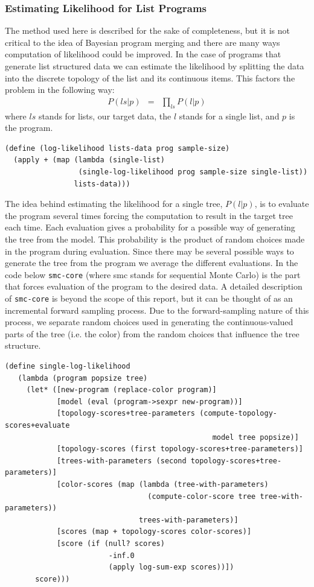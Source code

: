 \documentclass[a4paper,10pt]{article}
\begin{document}
\subsubsection{Estimating Likelihood for List Programs}
The method used here is described for the sake of completeness, but it is not critical to the idea of Bayesian program merging and there are many ways computation of likelihood could be improved.  In the case of programs that generate list structured data we can estimate the likelihood by splitting the data into the discrete topology of the list and its continuous items.  This factors the problem in the following way:
\begin{eqnarray}
P(ls|p) &=& \prod_{ls}P(l|p)
\end{eqnarray}
where $ls$ stands for lists, our target data, the $l$ stands for a single list, and $p$ is the program.
\begin{verbatim}
(define (log-likelihood lists-data prog sample-size)
  (apply + (map (lambda (single-list) 
                 (single-log-likelihood prog sample-size single-list)) 
                lists-data)))
\end{verbatim}
The idea behind estimating the likelihood for a single tree, $P(l|p)$, is to evaluate the program several times forcing the computation to result in the target tree each time.  Each evaluation gives a probability for a possible way of generating the tree from the model.  This probability is the product of random choices made in the program during evaluation.  Since there may be several possible ways to generate the tree from the program we average the different evaluations.  In the code below \texttt{smc-core} (where smc stands for sequential Monte Carlo) is the part that forces evaluation of the program to the desired data.  A detailed description of \texttt{smc-core} is beyond the scope of this report, but it can be thought of as an incremental forward sampling process.  Due to the forward-sampling nature of this process, we separate random choices used in generating the continuous-valued parts of the tree (i.e. the color) from the random choices that influence the tree structure.
\begin{verbatim}
(define single-log-likelihood 
   (lambda (program popsize tree)
     (let* ([new-program (replace-color program)]
            [model (eval (program->sexpr new-program))]
            [topology-scores+tree-parameters (compute-topology-scores+evaluate 
                                                model tree popsize)]
            [topology-scores (first topology-scores+tree-parameters)]
            [trees-with-parameters (second topology-scores+tree-parameters)]
            [color-scores (map (lambda (tree-with-parameters) 
                                 (compute-color-score tree tree-with-parameters)) 
                               trees-with-parameters)]
            [scores (map + topology-scores color-scores)]
            [score (if (null? scores)
                        -inf.0
                        (apply log-sum-exp scores))])
       score)))
\end{verbatim}
\end{document}

